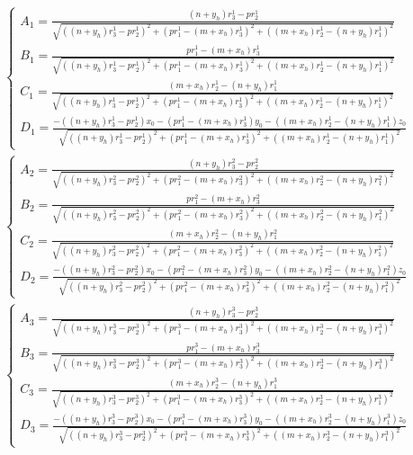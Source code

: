 $$\begin{gathered}
	\begin{cases}
		A_1 = \frac{(n + y_h) r_3^1 - p r_2^1}{\sqrt{((n + y_h) r_3^1 - p r_2^1)^2 + (p r_1^1 - (m + x_h) r_3^1)^2 + ((m + x_h) r_2^1 - (n + y_h) r_1^1)^2}} \\
		B_1 = \frac{p r_1^1 - (m + x_h) r_3^1}{\sqrt{((n + y_h) r_3^1 - p r_2^1)^2 + (p r_1^1 - (m + x_h) r_3^1)^2 + ((m + x_h) r_2^1 - (n + y_h) r_1^1)^2}} \\
		C_1 = \frac{(m + x_h) r_2^1 - (n + y_h) r_1^1}{\sqrt{((n + y_h) r_3^1 - p r_2^1)^2 + (p r_1^1 - (m + x_h) r_3^1)^2 + ((m + x_h) r_2^1 - (n + y_h) r_1^1)^2}} \\
		D_1 = \frac{- ((n + y_h) r_3^1 - p r_2^1) x_0 - (p r_1^1 - (m + x_h) r_3^1) y_0 - ((m + x_h) r_2^1 - (n + y_h) r_1^1) z_0}{\sqrt{((n + y_h) r_3^1 - p r_2^1)^2 + (p r_1^1 - (m + x_h) r_3^1)^2 + ((m + x_h) r_2^1 - (n + y_h) r_1^1)^2}}
	\end{cases} \\
	\begin{cases}
		A_2 = \frac{(n + y_h) r_3^2 - p r_2^2}{\sqrt{((n + y_h) r_3^2 - p r_2^2)^2 + (p r_1^2 - (m + x_h) r_3^2)^2 + ((m + x_h) r_2^2 - (n + y_h) r_1^2)^2}} \\
		B_2 = \frac{p r_1^2 - (m + x_h) r_3^2}{\sqrt{((n + y_h) r_3^2 - p r_2^2)^2 + (p r_1^2 - (m + x_h) r_3^2)^2 + ((m + x_h) r_2^2 - (n + y_h) r_1^2)^2}} \\
		C_2 = \frac{(m + x_h) r_2^2 - (n + y_h) r_1^2}{\sqrt{((n + y_h) r_3^2 - p r_2^2)^2 + (p r_1^2 - (m + x_h) r_3^2)^2 + ((m + x_h) r_2^2 - (n + y_h) r_1^2)^2}} \\
		D_2 = \frac{- ((n + y_h) r_3^2 - p r_2^2) x_0 - (p r_1^2 - (m + x_h) r_3^2) y_0 - ((m + x_h) r_2^2 - (n + y_h) r_1^2) z_0}{\sqrt{((n + y_h) r_3^2 - p r_2^2)^2 + (p r_1^2 - (m + x_h) r_3^2)^2 + ((m + x_h) r_2^2 - (n + y_h) r_1^2)^2}}
	\end{cases} \\
	\begin{cases}
		A_3 = \frac{(n + y_h) r_3^3 - p r_2^3}{\sqrt{((n + y_h) r_3^3 - p r_2^3)^2 + (p r_1^3 - (m + x_h) r_3^3)^2 + ((m + x_h) r_2^3 - (n + y_h) r_1^3)^2}} \\
		B_3 = \frac{p r_1^3 - (m + x_h) r_3^3}{\sqrt{((n + y_h) r_3^3 - p r_2^3)^2 + (p r_1^3 - (m + x_h) r_3^3)^2 + ((m + x_h) r_2^3 - (n + y_h) r_1^3)^2}} \\
		C_3 = \frac{(m + x_h) r_2^3 - (n + y_h) r_1^3}{\sqrt{((n + y_h) r_3^3 - p r_2^3)^2 + (p r_1^3 - (m + x_h) r_3^3)^2 + ((m + x_h) r_2^3 - (n + y_h) r_1^3)^2}} \\
		D_3 = \frac{- ((n + y_h) r_3^3 - p r_2^3) x_0 - (p r_1^3 - (m + x_h) r_3^3) y_0 - ((m + x_h) r_2^3 - (n + y_h) r_1^3) z_0}{\sqrt{((n + y_h) r_3^3 - p r_2^3)^2 + (p r_1^3 - (m + x_h) r_3^3)^2 + ((m + x_h) r_2^3 - (n + y_h) r_1^3)^2}}
	\end{cases}
\end{gathered}$$


